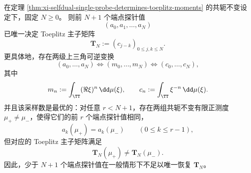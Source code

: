\begin{theorem}\label{thm:xi-endpoint-first-n-plus-one-probes-sharp-toeplitz-recovery}
在定理 \ref{thm:xi-selfdual-single-probe-determines-toeplitz-moments} 的共轭不变设定下，固定 \(N\ge 0\)。
则前 \(N+1\) 个端点探针值
\[
(a_0,a_1,\dots,a_N)
\]
已唯一决定 Toeplitz 主子矩阵
\[
\mathbf{T}_N:=(c_{j-k})_{0\le j,k\le N}.
\]
更具体地，存在两级上三角可逆变换
\[
(a_0,\dots,a_N)
\Longleftrightarrow
(m_0,\dots,m_N)
\Longleftrightarrow
(c_0,\dots,c_N),
\]
其中
\[
m_n:=\int_{\TT}(\Re\xi)^n\,\dd\mu(\xi),
\qquad
c_n:=\int_{\TT}\xi^{-n}\,\dd\mu(\xi).
\]
并且该采样数是最优的：对任意 \(r<N+1\)，存在两组共轭不变有限正测度 \(\mu_+\neq\mu_-\)，使得它们的前 \(r\) 个端点探针值相同，
\[
a_k(\mu_+)=a_k(\mu_-)\qquad(0\le k\le r-1),
\]
但对应的 Toeplitz 主子矩阵满足
\[
\mathbf{T}_N(\mu_+)\neq \mathbf{T}_N(\mu_-).
\]
因此，少于 \(N+1\) 个端点探针值在一般情形下不足以唯一恢复 \(\mathbf{T}_N\)。
\end{theorem}
